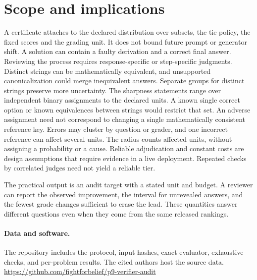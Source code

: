 \documentclass[11pt]{article}
\begin{document}
\section{Scope and implications}
A certificate attaches to the declared distribution over subsets, the tie policy, the fixed scores and the grading unit. It does not bound future prompt or generator shift. A solution can contain a faulty derivation and a correct final answer. Reviewing the process requires response-specific or step-specific judgments. Distinct strings can be mathematically equivalent, and unsupported canonicalization could merge inequivalent answers. Separate groups for distinct strings preserve more uncertainty. The sharpness statements range over independent binary assignments to the declared units. A known single correct option or known equivalences between strings would restrict that set. An adverse assignment need not correspond to changing a single mathematically consistent reference key. Errors may cluster by question or grader, and one incorrect reference can affect several units. The radius counts affected units, without assigning a probability or a cause. Reliable adjudication and constant costs are design assumptions that require evidence in a live deployment. Repeated checks by correlated judges need not yield a reliable tier.

The practical output is an audit target with a stated unit and budget. A reviewer can report the observed improvement, the interval for unrevealed answers, and the fewest grade changes sufficient to erase the lead. These quantities answer different questions even when they come from the same released rankings.
\paragraph{Data and software.} The repository includes the protocol, input hashes, exact evaluator, exhaustive checks, and per-problem results. The cited authors host the source data. \url{https://github.com/fightforbelief/p9-verifier-audit}
\end{document}
